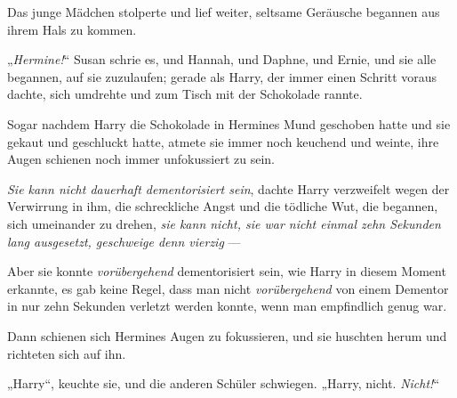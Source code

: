Das junge Mädchen stolperte und lief weiter, seltsame Geräusche begannen aus ihrem Hals zu kommen.

„\emph{Hermine!}“ Susan schrie es, und Hannah, und Daphne, und Ernie, und sie alle begannen, auf sie zuzulaufen; gerade als Harry, der immer einen Schritt voraus dachte, sich umdrehte und zum Tisch mit der Schokolade rannte.

Sogar nachdem Harry die Schokolade in Hermines Mund geschoben hatte und sie gekaut und geschluckt hatte, atmete sie immer noch keuchend und weinte, ihre Augen schienen noch immer unfokussiert zu sein.

\emph{Sie kann nicht dauerhaft dementorisiert sein}, dachte Harry verzweifelt wegen der Verwirrung in ihm, die schreckliche Angst und die tödliche Wut, die begannen, sich umeinander zu drehen, \emph{sie kann nicht, sie war nicht einmal zehn Sekunden lang ausgesetzt, geschweige denn vierzig} —

Aber sie konnte \emph{vorübergehend} dementorisiert sein, wie Harry in diesem Moment erkannte, es gab keine Regel, dass man nicht \emph{vorübergehend} von einem Dementor in nur zehn Sekunden verletzt werden konnte, wenn man empfindlich genug war.

Dann schienen sich Hermines Augen zu fokussieren, und sie huschten herum und richteten sich auf ihn.

„Harry“, keuchte sie, und die anderen Schüler schwiegen.
„Harry, nicht. \emph{Nicht!}“

